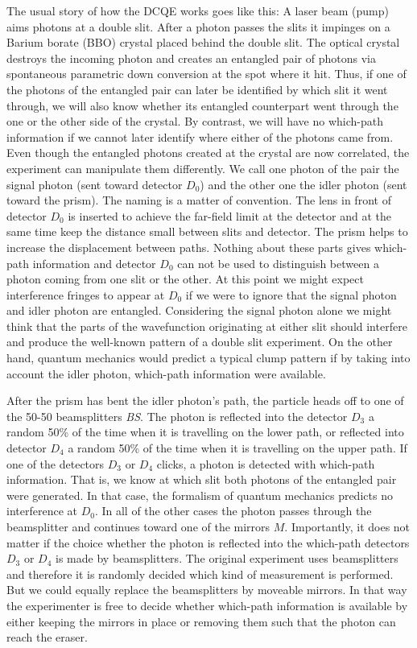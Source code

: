 \documentclass[12pt]{article}
\numberwithin{equation}{section}
\begin{document}
The usual story of how the DCQE works goes like this: A laser beam (pump) aims photons at a double slit. After a photon passes the slits it impinges on a Barium borate (BBO) crystal placed behind the double slit. The optical crystal destroys the incoming photon and creates an entangled pair of photons  via spontaneous parametric down conversion at the spot where it hit. Thus, if one of the photons of the entangled pair can later be identified by which slit it went through, we will also know whether its entangled counterpart went through the one or the other side of the crystal.   
By contrast, we will have no which-path information if we cannot later identify where either of the photons came from. Even though the entangled photons created at the crystal are now correlated, the experiment can manipulate them differently. We call one photon of the pair the signal photon (sent toward detector $D_0$) and the other one the idler photon (sent toward the prism). The naming is a matter of convention. The lens in front of detector $D_0$ is inserted to achieve the far-field limit at the detector and at the same time keep the distance small between slits and detector. The prism helps to increase the displacement between paths. Nothing about these parts gives which-path information and detector $D_0$ can not be used to distinguish between a photon coming from one slit or the other. At this point we might expect interference fringes to appear at $D_0$ if we were to ignore that the signal photon and idler photon are entangled. Considering the signal photon alone we might think that the parts of the wavefunction originating at either slit should interfere and produce the well-known pattern of a double slit experiment. On the other hand, quantum mechanics would predict a typical clump pattern if by taking into account the idler photon, which-path information were available.
 
After the prism has bent the idler photon's path, the particle heads off to one of the 50-50 beamsplitters \textit{BS}. The photon is reflected into the detector $D_3$ a random 50\% of the time when it is travelling on the lower path, or reflected into detector $D_4$ a random 50\% of the time when it is travelling on the upper path. If one of the detectors $D_3$ or $D_4$ clicks, a photon is detected with which-path information. That is, we know at which slit both photons of the entangled pair were generated. In that case, the formalism of quantum mechanics predicts no interference at $D_0$. In all of the other cases the photon passes through the beamsplitter and continues toward one of the mirrors $M$. Importantly, it does not matter if the choice whether the photon is reflected into the which-path detectors $D_3$ or $D_4$ is made by beamsplitters. The original experiment uses beamsplitters and therefore it is randomly decided which kind of measurement is performed. But we could equally replace the beamsplitters by moveable mirrors. In that way the experimenter is free to decide whether which-path information is available by either keeping the mirrors in place or removing them such that the photon can reach the eraser. 
\end{document}
